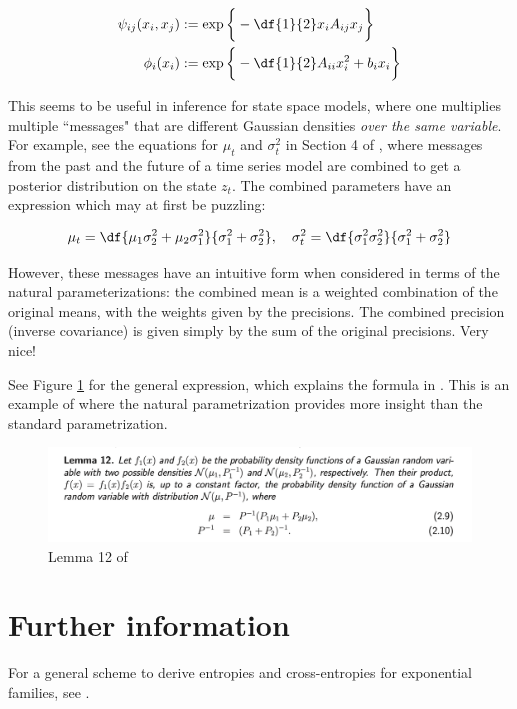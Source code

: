 \documentclass{article} %
\newcommand{\selfpotential}{\phi}
\newcommand{\edgepotential}{\psi}
\begin{document}
\begin{align*}
\edgepotential_{ij}(x_i, x_j) & := \exp \bigg\{ -\df{1}{2} x_i A_{ij} x_j \bigg\}  \\
\selfpotential_{i}(x_i) & := \exp \bigg\{ -\df{1}{2} A_{ii} x_i^2 + b_i x_i \bigg\}  
\end{align*}

This seems to be useful in inference for state space models, where one multiplies multiple ``messages" that are different Gaussian densities \textit{over the same variable}.   For example, see  the equations for $\mu_t$ and $\sigma^2_t$ in Section 4 of \cite{krishnan2016structured}, where messages from the past and the future of a time series model are combined to get a posterior distribution on the state $z_t$.   The combined parameters have an expression which may at first be puzzling:

\[ \mu_t = \df{\mu_1 \sigma^2_2 + \mu_2 \sigma^2_1}{\sigma^2_1 + \sigma^2_2}  , \quad \sigma^2_t = \df{\sigma^2_1 \sigma^2_2}{ \sigma^2_1 + \sigma^2_2} \]

However, these messages have an intuitive form when considered in terms of the natural parameterizations:  the combined mean is a weighted combination of the original means, with the weights given by the precisions.   The combined precision (inverse covariance) is given simply by the sum of the original precisions.  Very nice! 

 See Figure \ref{fig:lemma_twelve_bickson} for the general expression, which explains the formula in  \cite{krishnan2016structured}.  This is an example of where the natural parametrization provides more insight than the standard parametrization. 

\begin{figure}[H]
\includegraphics[width=\textwidth]{images/bickson_lemma_12}
\caption{Lemma 12 of \cite{bickson2008gaussian}}
\label{fig:lemma_twelve_bickson}
\end{figure}

\section{Further information}

For a general scheme to derive entropies and cross-entropies for exponential families,  see \cite{nielsen2010entropies}.

{}

\end{document}
